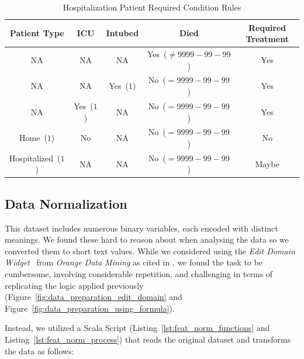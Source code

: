 \begin{table}[H]
    \centering
    \caption{Hospitalization Patient Required Condition Rules}
    \label{tab:target_variable_rules}
    \begin{tabular}{ccccc} \hline
     \textbf{Patient Type} & \textbf{ICU} & \textbf{Intubed} & \textbf{Died} & \textbf{Required Treatment}\\ 
     \hline \hline
      NA & NA & NA & Yes~($\neq 9999-99-99$) & Yes \\
      NA & NA & Yes~($1$) & No~($= 9999-99-99$) & Yes \\ 
      NA & Yes~($1$) & NA & No~($= 9999-99-99$) & Yes \\
      Home~($1$) & No & NA & No~($= 9999-99-99$) & No \\
      Hospitalized~($1$) & NA & NA & No~($= 9999-99-99$) & Maybe \\ \hline
    \end{tabular}
\end{table}

\subsection{Data Normalization}
This dataset includes numerous binary variables, each encoded 
with distinct meanings. We found these hard to reason about when
analysing the data so we converted them to short text values.
While we considered using 
the \emph{Edit Domain Widget}~\parencite[]{2015:odm} from
\emph{Orange Data Mining} as cited in , we found the task to be 
cumbersome, involving considerable repetition, and challenging in terms of 
replicating the logic applied previously (Figure~\ref{fig:data_preparation_edit_domain} 
and Figure~\ref{fig:data_preparation_using_formula}). 

Instead, we utilized a Scala Script (Listing~\ref{lst:feat_norm_functions} and Listing~\ref{lst:feat_norm_process}) that reads the original dataset 
and transforms the data as follows:


